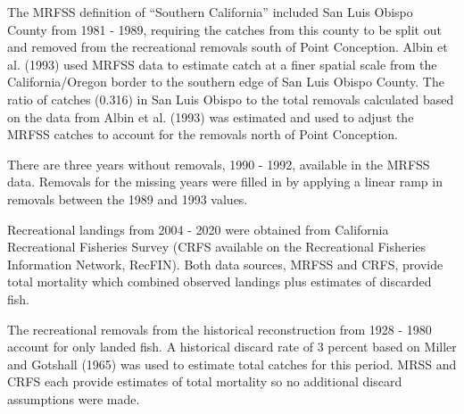 \documentclass[11pt,
  english,
  a4paper,
]{article}
\begin{document}

The MRFSS definition of ``Southern California'' included San Luis Obispo County from 1981 - 1989, requiring the catches from this county to be split out and removed from the recreational removals south of Point Conception. Albin et al. {(1993)\leavevmode\tagmcend\tagstructend} used MRFSS data to estimate catch at a finer spatial scale from the California/Oregon border to the southern edge of San Luis Obispo County. The ratio of catches (0.316) in San Luis Obispo to the total removals calculated based on the data from Albin et al. {(1993)\leavevmode\tagmcend\tagstructend} was estimated and used to adjust the MRFSS catches to account for the removals north of Point Conception.

\leavevmode\tagmcend\tagstructend\par


There are three years without removals, 1990 - 1992, available in the MRFSS data. Removals for the missing years were filled in by applying a linear ramp in removals between the 1989 and 1993 values.

\leavevmode\tagmcend\tagstructend\par


Recreational landings from 2004 - 2020 were obtained from California Recreational Fisheries Survey (CRFS available on the Recreational Fisheries Information Network, RecFIN). Both data sources, MRFSS and CRFS, provide total mortality which combined observed landings plus estimates of discarded fish.

\leavevmode\tagmcend\tagstructend\par


The recreational removals from the historical reconstruction from 1928 - 1980 account for only landed fish. A historical discard rate of 3 percent based on Miller and Gotshall {(1965)\leavevmode\tagmcend\tagstructend} was used to estimate total catches for this period. MRSS and CRFS each provide estimates of total mortality so no additional discard assumptions were made.

\leavevmode\tagmcend\tagstructend\par
\end{document}

